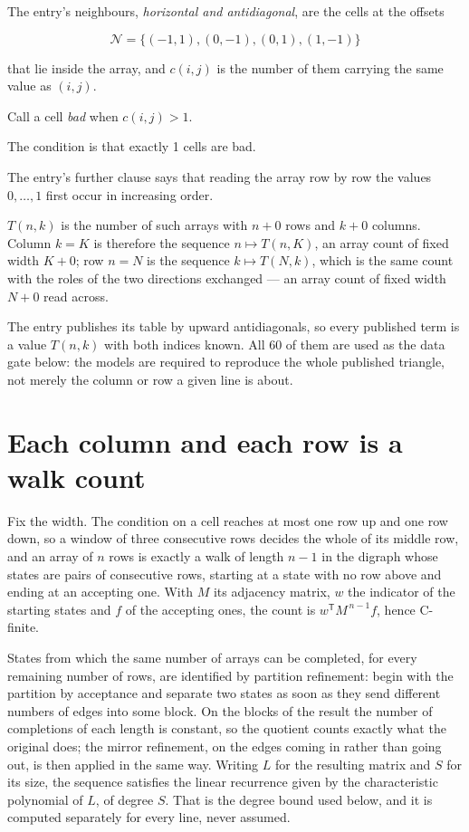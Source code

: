 \documentclass[11pt]{article}
\theoremstyle{definition}
\begin{document}
The entry's neighbours, {\itshape horizontal and antidiagonal}, are the cells at the offsets

\[\mathcal{N} = \{(-1,1), (0,-1), (0,1), (1,-1)\}\]

that lie inside the array, and $c(i,j)$ is the number of them carrying the same value as $(i,j)$.

Call a cell {\itshape bad} when $c(i,j) > 1$.

The condition is that exactly 1 cells are bad.

The entry's further clause says that reading the array row by row the values $0,\dots,1$ first occur in increasing order.

$T(n,k)$ is the number of such arrays with $n + 0$ rows and $k + 0$ columns. Column $k = K$ is therefore the sequence $n \mapsto T(n,K)$, an array count of fixed width $K + 0$; row $n = N$ is the sequence $k \mapsto T(N,k)$, which is the same count with the roles of the two directions exchanged --- an array count of fixed width $N + 0$ read across.

The entry publishes its table by upward antidiagonals, so every published term is a value $T(n,k)$ with both indices known. All 60 of them are used as the data gate below: the models are required to reproduce the whole published triangle, not merely the column or row a given line is about.

\section{Each column and each row is a walk count}

Fix the width. The condition on a cell reaches at most one row up and one row down, so a window of three consecutive rows decides the whole of its middle row, and an array of $n$ rows is exactly a walk of length $n-1$ in the digraph whose states are pairs of consecutive rows, starting at a state with no row above and ending at an accepting one. With $M$ its adjacency matrix, $w$ the indicator of the starting states and $f$ of the accepting ones, the count is $w^{\mathsf T}M^{\,n-1}f$, hence C-finite.

States from which the same number of arrays can be completed, for every remaining number of rows, are identified by partition refinement: begin with the partition by acceptance and separate two states as soon as they send different numbers of edges into some block. On the blocks of the result the number of completions of each length is constant, so the quotient counts exactly what the original does; the mirror refinement, on the edges coming in rather than going out, is then applied in the same way. Writing $L$ for the resulting matrix and $S$ for its size, the sequence satisfies the linear recurrence given by the characteristic polynomial of $L$, of degree $S$. That is the degree bound used below, and it is computed separately for every line, never assumed.
\end{document}
